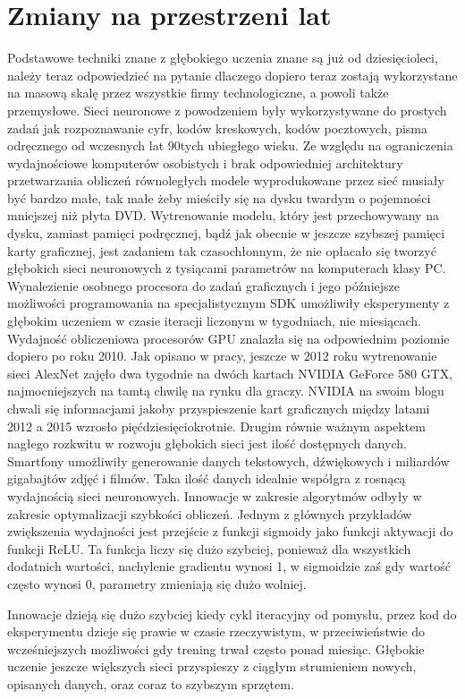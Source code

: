 \documentclass[12pt,a4paper,twoside,titlepage,openright]{book}
\begin{document}
\section{Zmiany na przestrzeni lat}
Podstawowe techniki znane z głębokiego uczenia znane są już od dziesięcioleci, należy teraz odpowiedzieć na pytanie dlaczego dopiero teraz zostają wykorzystane na masową skalę przez wszystkie firmy technologiczne, a powoli także przemysłowe. Sieci neuronowe z powodzeniem były wykorzystywane do prostych zadań jak rozpoznawanie cyfr, kodów kreskowych, kodów pocztowych, pisma odręcznego od wczesnych lat 90tych ubiegłego wieku. Ze względu na ograniczenia wydajnościowe komputerów osobistych i brak odpowiedniej architektury przetwarzania obliczeń równoległych modele wyprodukowane przez sieć musiały być bardzo małe, tak małe żeby mieściły się na dysku twardym o pojemności mniejszej niż płyta DVD. Wytrenowanie modelu, który jest przechowywany na dysku, zamiast pamięci podręcznej, bądź jak obecnie w jeszcze szybszej pamięci karty graficznej, jest zadaniem tak czasochłonnym, że nie opłacało się tworzyć głębokich sieci neuronowych z tysiącami parametrów na komputerach klasy PC. Wynalezienie osobnego procesora do zadań graficznych i jego późniejsze możliwości programowania na specjalistycznym SDK umożliwiły eksperymenty z głębokim uczeniem w czasie iteracji liczonym w tygodniach, nie miesiącach. Wydajność obliczeniowa procesorów GPU znalazła się na odpowiednim poziomie dopiero po roku 2010. Jak opisano w pracy, jeszcze w 2012 roku wytrenowanie sieci AlexNet zajęło dwa tygodnie na dwóch kartach NVIDIA GeForce 580 GTX, najmocniejszych na tamtą chwilę na rynku dla graczy. NVIDIA na swoim blogu chwali się informacjami jakoby przyspieszenie kart graficznych między latami 2012 a 2015 wzrosło pięćdziesięciokrotnie. \cite{siteNvidiaAcceleration} Drugim równie ważnym aspektem nagłego rozkwitu w rozwoju głębokich sieci jest ilość dostępnych danych. Smartfony umożliwiły generowanie danych tekstowych, dźwiękowych i miliardów gigabajtów zdjęć i filmów. Taka ilość danych idealnie współgra z rosnącą wydajnością sieci neuronowych. Innowacje w zakresie algorytmów odbyły w zakresie optymalizacji szybkości obliczeń. Jednym z głównych przykładów zwiększenia wydajności jest przejście z funkcji sigmoidy jako funkcji aktywacji do funkcji ReLU. Ta funkcja liczy się dużo szybciej, ponieważ dla wszystkich dodatnich wartości, nachylenie gradientu wynosi 1, w sigmoidzie zaś gdy wartość często wynosi 0, parametry zmieniają się dużo wolniej.

Innowacje dzieją się dużo szybciej kiedy cykl iteracyjny od pomysłu, przez kod do eksperymentu dzieje się prawie w czasie rzeczywistym, w przeciwieństwie do wcześniejszych możliwości gdy trening trwał często ponad miesiąc. Głębokie uczenie jeszcze większych sieci przyspieszy z ciągłym strumieniem nowych, opisanych danych, oraz coraz to szybszym sprzętem.
\end{document}
